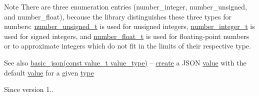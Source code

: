 \begin{DoxyNote}{Note}
There are three enumeration entries (number\+\_\+integer, number\+\_\+unsigned, and number\+\_\+float), because the library distinguishes these three types for numbers\+: \hyperlink{classnlohmann_1_1basic__json_a60a04166c122072ab11eaf9845d9cd1d}{number\+\_\+unsigned\+\_\+t} is used for unsigned integers, \hyperlink{classnlohmann_1_1basic__json_ac4b10b2364f26ce47bdb9a413ff04a59}{number\+\_\+integer\+\_\+t} is used for signed integers, and \hyperlink{classnlohmann_1_1basic__json_a74a0013e847fdc574b48f931f0e757e1}{number\+\_\+float\+\_\+t} is used for floating-\/point numbers or to approximate integers which do not fit in the limits of their respective type.
\end{DoxyNote}
\begin{DoxySeeAlso}{See also}
\hyperlink{classnlohmann_1_1basic__json_a8f77085bd98c97a983d9ba12efbf6148}{basic\+\_\+json(const value\+\_\+t value\+\_\+type)} -- \hyperlink{classnlohmann_1_1basic__json_afdb7a485369fbfd8c4c7c134ebb1feb5}{create} a J\+S\+ON \hyperlink{classnlohmann_1_1basic__json_a407e73a037e6e3067ef7aa2c25a79f39}{value} with the default \hyperlink{classnlohmann_1_1basic__json_a407e73a037e6e3067ef7aa2c25a79f39}{value} for a given \hyperlink{classnlohmann_1_1basic__json_a5d466b240d0ba9f648d7fd4ff42359f5}{type}
\end{DoxySeeAlso}
\begin{DoxySince}{Since}
version 1.. 
\end{DoxySince}
